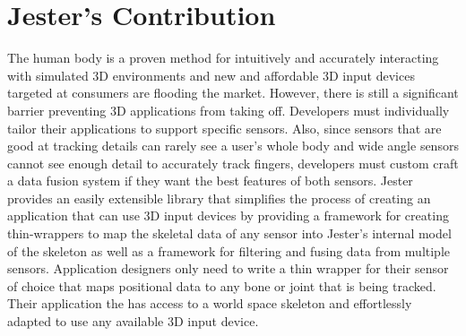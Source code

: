 \section{Jester's Contribution}

The human body is a proven method for intuitively and accurately interacting with simulated 3D environments and new and affordable 3D input devices targeted at consumers are flooding the market. However, there is still a significant barrier preventing 3D applications from taking off. Developers must individually tailor their applications to support specific sensors. Also, since sensors that are good at tracking details can rarely see a user’s whole body and wide angle sensors cannot see enough detail to accurately track fingers, developers must custom craft a data fusion system if they want the best features of both sensors. Jester provides an easily extensible library that simplifies the process of creating an application that can use 3D input devices by providing a framework for creating thin-wrappers to map the skeletal data of any sensor into Jester’s internal model of the skeleton as well as a framework for filtering and fusing data from multiple sensors. Application designers only need to write a thin wrapper for their sensor of choice that maps positional data to any bone or joint that is being tracked. Their application the has access to a world space skeleton and effortlessly adapted to use any available 3D input device.